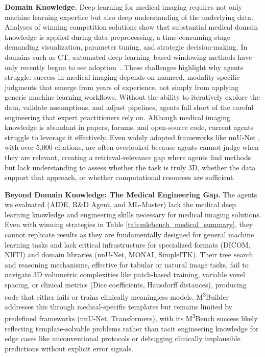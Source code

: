 \documentclass{midl} %
\begin{document}
\vspace{3pt} \noindent \textbf{Domain Knowledge.} Deep learning for medical imaging requires not only machine learning expertise but also deep understanding of the underlying data. Analyses of winning competition solutions show that substantial medical domain knowledge is applied during data preprocessing, a time-consuming stage demanding visualization, parameter tuning, and strategic decision-making. In domains such as CT, automated deep learning–based windowing methods have only recently begun to see adoption~\cite{Zhang2025InterpretableAW, Lee2018PracticalWS}. These challenges highlight why agents struggle: success in medical imaging depends on nuanced, modality‑specific judgments that emerge from years of experience, not simply from applying generic machine learning workflows. Without the ability to iteratively explore the data, validate assumptions, and adjust pipelines, agents fall short of the careful engineering that expert practitioners rely on. Although medical imaging knowledge is abundant in papers, forums, and open-source code, current agents struggle to leverage it effectively. Even widely adopted frameworks like nnU-Net \cite{Isensee2020nnUNetAS}, with over 5,000 citations, are often overlooked because agents cannot judge when they are relevant, creating a retrieval‑relevance gap where agents find methods but lack understanding to assess whether the task is truly 3D, whether the data support that approach, or whether computational resources are sufficient.


\vspace{3pt} \noindent \textbf{Beyond Domain Knowledge: The Medical Engineering Gap.}
The agents we evaluated (AIDE, R\&D Agent, and ML-Master) lack the medical deep learning knowledge and engineering skills necessary for medical imaging solutions. Even with winning strategies in Table \ref{tab:mlebench_medical_summary}, they cannot replicate results as they are fundamentally designed for general machine learning tasks and lack critical infrastructure for specialized formats (DICOM, NIfTI) and domain libraries (nnU-Net, MONAI, SimpleITK). Their tree search and reasoning mechanisms, effective for tabular or natural image tasks, fail to navigate 3D volumetric complexities like patch-based training, variable voxel spacing, or clinical metrics (Dice coefficients, Hausdorff distances), producing code that either fails or trains clinically meaningless models. M\textsuperscript{3}Builder~\citep{feng2025m} addresses this through medical-specific templates but remains limited by predefined frameworks (nnU-Net, Transformers), with its M\textsuperscript{3}Bench success likely reflecting template-solvable problems rather than tacit engineering knowledge for edge cases like unconventional protocols or debugging clinically implausible predictions without explicit error signals.
\end{document}
